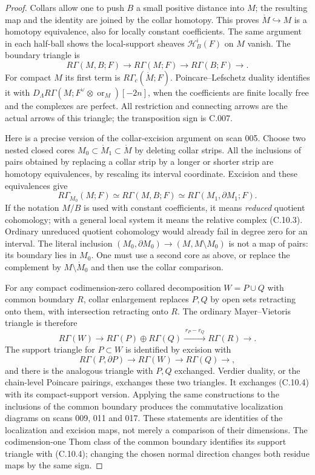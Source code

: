 \begin{proof}
Collars allow one to push $B$ a small positive distance into $M$;
the resulting map and the identity are joined by the collar
homotopy. This proves $\mathring M\hookrightarrow M$ is a homotopy
equivalence, also for locally constant coefficients. The same
argument in each half-ball shows the local-support sheaves
$\mathcal H^i_B(F)$ on $M$ vanish. The boundary triangle is
\[
 R\Gamma(M,B;F)\longrightarrow R\Gamma(M;F)
 \longrightarrow R\Gamma(B;F)\longrightarrow.
 \tag{C.10.3}
\]
For compact $M$ its first term is $R\Gamma_c(\mathring M;F)$.
Poincare--Lefschetz duality identifies it with
$D_\Lambda R\Gamma(M;F^\vee\otimes\operatorname{or}_M)[-2n]$,
when the coefficients are finite locally free and the complexes are
perfect. All restriction and connecting arrows are the actual
arrows of this triangle; the transposition sign is C.007.

Here is a precise version of the collar-excision argument on scan
005. Choose two nested closed cores $M_0\subset\mathring M_1\subset
\mathring M$ by deleting collar strips. All the inclusions of pairs
obtained by replacing a collar strip by a longer or shorter strip
are homotopy equivalences, by rescaling its interval coordinate.
Excision and these equivalences give
\[
 R\Gamma_{M_0}(M;F)\simeq R\Gamma(M,B;F)
 \simeq R\Gamma(M_1,\partial M_1;F).
\]
If the notation $M/B$ is used with constant coefficients, it means
\emph{reduced} quotient cohomology; with a general local system it
means the relative complex (C.10.3). Ordinary unreduced quotient
cohomology would already fail in degree zero for an interval.
The literal inclusion $(M_0,\partial M_0)\to(M,M\setminus M_0)$
is not a map of pairs: its boundary lies in $M_0$. One must use a
second core as above, or replace the complement by
$M\setminus\mathring M_0$ and then use the collar comparison.

For any compact codimension-zero collared decomposition
$W=P\cup Q$ with common boundary $R$, collar enlargement replaces
$P,Q$ by open sets retracting onto them, with intersection
retracting onto $R$. The ordinary Mayer--Vietoris triangle is
therefore
\[
 R\Gamma(W)\longrightarrow R\Gamma(P)\oplus R\Gamma(Q)
 \xrightarrow{\,r_P-r_Q\,}R\Gamma(R)\longrightarrow.
 \tag{C.10.4}
\]
The support triangle for $P\subset W$ is identified by excision
with
\[
 R\Gamma(P,\partial P)\longrightarrow R\Gamma(W)
 \longrightarrow R\Gamma(Q)\longrightarrow,
 \tag{C.10.5}
\]
and there is the analogous triangle with $P,Q$ exchanged.
Verdier duality, or the chain-level Poincare pairings, exchanges
these two triangles. It exchanges (C.10.4) with its compact-support
version. Applying the same constructions to the inclusions of
the common boundary produces the commutative localization
diagrams on scans 009, 011 and 017. These statements are identities
of the localization and excision maps, not merely a comparison of
their dimensions. The codimension-one Thom class of the common
boundary identifies its support triangle with (C.10.4); changing
the chosen normal direction changes both residue maps by the same
sign.


\end{proof}
